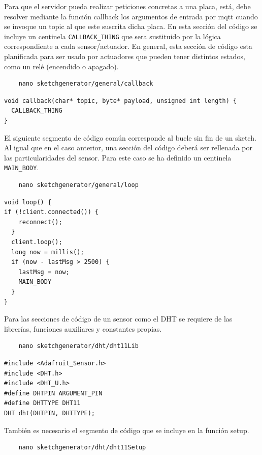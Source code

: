 Para que el servidor pueda realizar peticiones concretas a una placa, está, debe resolver mediante la función callback los argumentos de entrada por \gls{mqtt} cuando se invoque un topic al que este suscrita dicha placa. En esta sección del código se incluye un centinela \verb|CALLBACK_THING| que sera sustituido por la lógica correspondiente a cada sensor/actuador. En general, esta sección de código esta planificada para ser usado por actuadores que pueden tener distintos estados, como un relé (encendido o apagado).

\begin{verbatim}
    nano sketchgenerator/general/callback
\end{verbatim}

\begin{verbatim}
void callback(char* topic, byte* payload, unsigned int length) {
  CALLBACK_THING
}
\end{verbatim}


El siguiente segmento de código común corresponde al bucle sin fin de un \gls{sketch}. Al igual que en el caso anterior, una sección del código deberá ser rellenada por las particularidades del sensor. Para este caso se ha definido un centinela \verb|MAIN_BODY|.

\begin{verbatim}
    nano sketchgenerator/general/loop
\end{verbatim}

\begin{verbatim}
void loop() {
if (!client.connected()) {
    reconnect();
  }
  client.loop();
  long now = millis();
  if (now - lastMsg > 2500) {
    lastMsg = now;
    MAIN_BODY
  }
}
\end{verbatim}

Para las secciones de código de un sensor como el DHT se requiere de las librerías, funciones auxiliares y constantes propias.
\begin{verbatim}
    nano sketchgenerator/dht/dht11Lib
\end{verbatim}

\begin{verbatim}
#include <Adafruit_Sensor.h>
#include <DHT.h>
#include <DHT_U.h>
#define DHTPIN ARGUMENT_PIN
#define DHTTYPE DHT11
DHT dht(DHTPIN, DHTTYPE);
\end{verbatim}

También es necesario el segmento de código que se incluye en la función setup.
\begin{verbatim}
    nano sketchgenerator/dht/dht11Setup
\end{verbatim}

